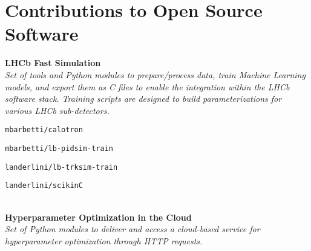 \newcommand{\software}[1]
  {\normalsize \color{hlcolor-0} \textbf{#1}}

\newcommand{\pkginfo}[1]
  {\small \color{hlcolor-1} {\ul{\textsc{Languages}:} #1}}
  
\newcommand{\pkgdesc}[1]
  {\normalsize \color{maincolor} \emph{#1}}


\section*{Contributions to Open Source Software}
\begin{cvcontent}
  \software{LHCb Fast Simulation}
  \\ [1.5mm]
  \pkgdesc{Set of tools and Python modules to prepare/process data, 
  train Machine Learning models, and export them as C files to enable 
  the integration within the LHCb software stack. Training scripts
  are designed to build parameterizations for various LHCb sub-detectors.}
  \\ [1.5mm]
  \begin{itemize*}[label=\textcolor{iconcolor}{\textbullet}]
    \item \texttt{mbarbetti/calotron} \hfill
      \href{https://pypi.org/project/calotron}{\faPython}
      \href{https://github.com/mbarbetti/calotron}{\faGithub}
    \\ [0.5mm]
    \item \texttt{mbarbetti/lb-pidsim-train} \hfill
      \href{https://github.com/mbarbetti/lb-pidsim-train}{\faGithub}
    \\ [0.5mm]
    \item \texttt{landerlini/lb-trksim-train} \hfill
      \href{https://github.com/landerlini/lb-trksim-train}{\faGithub}
    \\ [0.5mm]
    \item \texttt{landerlini/scikinC} \hfill
      \href{https://pypi.org/project/scikinC}{\faPython}
      \href{https://github.com/landerlini/scikinC}{\faGithub}
  \end{itemize*}
  \\ [6mm]
  \software{Hyperparameter Optimization in the Cloud}
  \\ [1.5mm]
  \pkgdesc{Set of Python modules to deliver and access a cloud-based
  service for hyperparameter optimization through HTTP requests. 
}
\end{cvcontent}
